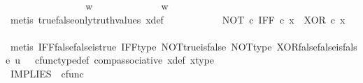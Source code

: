 \begin{isabellebody}
\ \ \ \ \ \ \isamarkupfalse%
\isanewline
\ \ \ \ \ \ \ \ \isamarkupfalse%
\ {\isachardoublequoteopen}w\ {\isasymnoteq}\ {\isasymt}{\isachardoublequoteclose}\isanewline
\ \ \ \ \ \ \ \ \isamarkupfalse%
\ \isamarkupfalse%
\ {\isachardoublequoteopen}w\ {\isacharequal}{\kern0pt}\ {\isasymf}{\isachardoublequoteclose}\isanewline
\ \ \ \ \ \ \ \ \ \ \isamarkupfalse%
\ {\isacharparenleft}{\kern0pt}metis\ true{\isacharunderscore}{\kern0pt}false{\isacharunderscore}{\kern0pt}only{\isacharunderscore}{\kern0pt}truth{\isacharunderscore}{\kern0pt}values\ x{\isacharunderscore}{\kern0pt}def{\isacharparenright}{\kern0pt}\isanewline
\ \ \ \ \ \ \ \ \isamarkupfalse%
\ \isamarkupfalse%
\ {\isachardoublequoteopen}{\isacharparenleft}{\kern0pt}NOT\ {\isasymcirc}\isactrlsub c\ IFF{\isacharparenright}{\kern0pt}\ {\isasymcirc}\isactrlsub c\ x\ {\isacharequal}{\kern0pt}\ XOR\ {\isasymcirc}\isactrlsub c\ x{\isachardoublequoteclose}\isanewline
\ \ \ \ \ \ \ \ \ \ \isamarkupfalse%
\ {\isacharparenleft}{\kern0pt}metis\ IFF{\isacharunderscore}{\kern0pt}false{\isacharunderscore}{\kern0pt}false{\isacharunderscore}{\kern0pt}is{\isacharunderscore}{\kern0pt}true\ IFF{\isacharunderscore}{\kern0pt}type\ NOT{\isacharunderscore}{\kern0pt}true{\isacharunderscore}{\kern0pt}is{\isacharunderscore}{\kern0pt}false\ NOT{\isacharunderscore}{\kern0pt}type\ XOR{\isacharunderscore}{\kern0pt}false{\isacharunderscore}{\kern0pt}false{\isacharunderscore}{\kern0pt}is{\isacharunderscore}{\kern0pt}false\ {\isacartoucheopen}u\ {\isacharequal}{\kern0pt}\ {\isasymf}{\isacartoucheclose}\ cfunc{\isacharunderscore}{\kern0pt}type{\isacharunderscore}{\kern0pt}def\ comp{\isacharunderscore}{\kern0pt}associative\ x{\isacharunderscore}{\kern0pt}def\ x{\isacharunderscore}{\kern0pt}type{\isacharparenright}{\kern0pt}\isanewline
\ \ \ \ \ \ \isamarkupfalse%
\isanewline
\ \ \ \ \isamarkupfalse%
\isanewline
\ \ \isamarkupfalse%
\isanewline
{}\isamarkupfalse%
%
\endisatagproof
{\isafoldproof}%
%
\isadelimproof
%
\endisadelimproof
%
\isadelimdocument
%
\endisadelimdocument
%
\isatagdocument
%
\isamarkuptrue%
%
\endisatagdocument
{\isafolddocument}%
%
\isadelimdocument
%
\endisadelimdocument
{}\isamarkupfalse%
\ IMPLIES\ {\isacharcolon}{\kern0pt}{\isacharcolon}{\kern0pt}\ {\isachardoublequoteopen}cfunc{\isachardoublequoteclose}\ \isanewline

\end{isabellebody}
